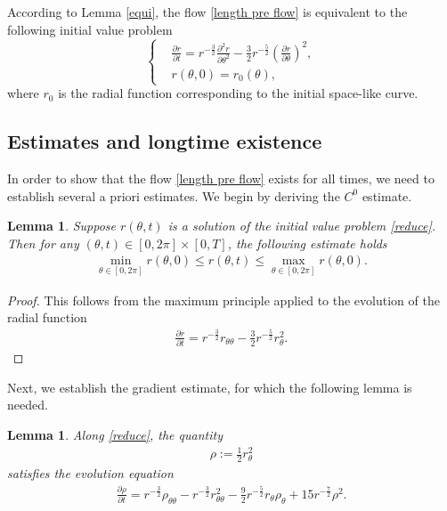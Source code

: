\documentclass[reqno,11pt, letterpaper]{amsart}
\theoremstyle{plain}
\newtheorem{lem}[thm]{Lemma}
\theoremstyle{definition}
\numberwithin{equation}{section}
\begin{document}
According to Lemma \ref{equi}, the flow \eqref{length pre flow} is equivalent to the following initial value problem
\begin{equation}\label{reduce}
	\left\{
	\begin{aligned}
		&\frac{\partial r}{\partial t}= r^{-\frac{3}{2}}\frac{\partial^2 r}{\partial\theta^2}-\frac{3}{2} r^{-\frac{5}{2}}\left(\frac{\partial r}{\partial\theta}\right)^2,\\
		& r(\theta,0)= r_0(\theta),
	\end{aligned}
	\right.
\end{equation}
where $ r_0$ is the radial function corresponding to the initial space-like curve.


\subsection{Estimates and longtime existence}
In order to show that the flow \eqref{length pre flow} exists for all times, we need to establish several a priori estimates. We begin by deriving the $C^0$ estimate.  
\begin{lem}\label{C0}
	Suppose $ r(\theta,t)$ is a solution of the initial value problem \eqref{reduce}. Then for any $(\theta,t)\in[0,2\pi]\times[0,T]$, the following estimate holds
	\begin{align*}
		\min\limits_{\theta\in[0,2\pi]} r(\theta,0)\le r(\theta,t)\le\max\limits_{\theta\in[0,2\pi]} r(\theta,0).
	\end{align*}
\end{lem}
\begin{proof}
	This follows from the maximum principle applied to the evolution of the radial function 
	\begin{align}\label{0order}
		\frac{\partial r}{\partial t}= r^{-\frac{3}{2}} r_{\theta\theta}-\frac{3}{2} r^{-\frac{5}{2}} r_\theta^2.
	\end{align}
\end{proof}
Next, we establish the gradient estimate, for which the following lemma is needed.
\begin{lem}\label{rho evo}
	Along \eqref{reduce}, the quantity 
	\begin{align*}
		\rho:=\frac{1}{2} r_\theta^2
	\end{align*}
	satisfies the evolution equation
	\begin{align*}
		\frac{\partial\rho}{\partial t}= r^{-\frac{3}{2}}\rho_{\theta\theta}- r^{-\frac{3}{2}} r_{\theta\theta}^2-\frac{9}{2} r^{-\frac{5}{2}} r_\theta\rho_\theta+15 r^{-\frac{7}{2}}\rho^2.
	\end{align*}
\end{lem}
\end{document}
